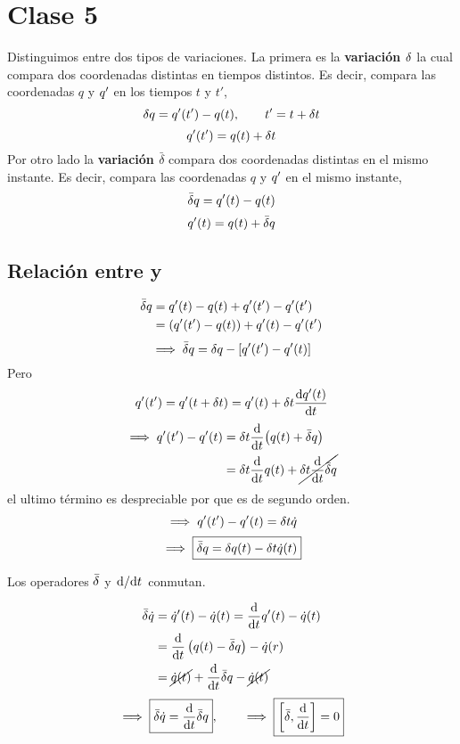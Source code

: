 \section{Clase 5}\label{clase:5}
Distinguimos entre dos tipos de variaciones. La primera es la \textbf{variación $\delta$} la cual compara dos coordenadas distintas en tiempos distintos. Es decir, compara las coordenadas $q$ y $q'$ en los tiempos $t$ y $t'$,
\begin{equation}
  \delta q=q'(t')-q(t),\qquad t'=t+\delta t
\end{equation}
\begin{equation}
  q'(t')=q(t)+\delta t
\end{equation}
Por otro lado la \textbf{variación $\bar{\delta}$} compara dos coordenadas distintas en el mismo instante. Es decir, compara las coordenadas $q$ y $q'$ en el mismo instante,
\begin{equation}
  \bar{\delta} q=q'(t)-q(t)
\end{equation}
\begin{equation}
  q'(t)=q(t)+\bar{\delta} q
\end{equation}
\subsection{Relación entre  y }
\begin{align}
  \bar{\delta} q&=q'(t)-q(t)+q'(t')-q'(t')\\
  &=(q'(t')-q(t))+q'(t)-q'(t')
\end{align}
\begin{equation}\label{5.1.1}
  \implies \bar{\delta} q=\delta q-[q'(t')-q'(t)]
\end{equation}
Pero
\begin{equation}
  q'(t')=q'(t+\delta t)=q'(t)+\delta t\dv{q'(t)}{t}
\end{equation}
\begin{align}
  \implies q'(t')-q'(t)&=\delta t\dv{t}(q(t)+\bar{\delta} q)\\
  &=\delta t\dv{t}q(t)+\cancel{\delta t\dv{t}\bar{\delta} q}
\end{align}
el ultimo término es despreciable por que es de segundo orden.
\begin{equation}
  \implies q'(t')-q'(t)=\delta t\dot{q}
\end{equation}
\begin{equation}
  \implies\boxed{ \bar{\delta} q=\delta q(t)-\delta t\dot{q}(t)}
\end{equation}

\begin{prop}
	Los operadores $\bar{\delta}$ y $\dv*{t}$ conmutan.
\end{prop}
\begin{align}
  \bar{\delta} \dot{q}&=\dot{q}'(t)-\dot{q}(t)=\dv{t}q'(t)-\dot{q}(t)\\
  &=\dv{t}\left(q(t)-\bar{\delta} q\right)-\dot{q}(r)\\
  &=\cancel{\dot{q}(t)}+\dv{t}\bar{\delta} q-\cancel{\dot{q}(t)}
\end{align}
\begin{equation}
  \implies \boxed{\bar{\delta}\dot{q}=\dv{t}\bar{\delta} q},\qquad\implies  \boxed{\left[\bar{\delta},\dv{t}\right]=0}
\end{equation}

